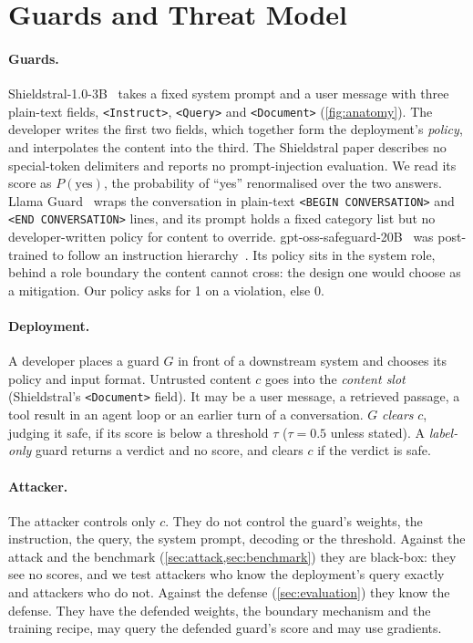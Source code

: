 \section{Guards and Threat Model}
\label{sec:background}

\paragraph{Guards.}
Shieldstral-1.0-3B~\citep{calvi2026shieldstral} takes a fixed system prompt and a user message with three plain-text fields, \texttt{<Instruct>}, \texttt{<Query>} and \texttt{<Document>} (\cref{fig:anatomy}). %
The developer writes the first two fields, which together form the deployment's \emph{policy}, and interpolates the content into the third.
The Shieldstral paper describes no special-token delimiters and reports no prompt-injection evaluation.
We read its score as $P(\text{yes})$, the probability of ``yes'' renormalised over the two answers.
Llama Guard~\citep{inan2023llama,grattafiori2024llama,chi2024llama,meta2025llamaguard4} wraps the conversation in plain-text \texttt{<BEGIN CONVERSATION>} and \texttt{<END CONVERSATION>} lines, and its prompt holds a fixed category list but no developer-written policy for content to override.
gpt-oss-safeguard-20B~\citep{openai2025gptosssafeguard} was post-trained to follow an instruction hierarchy~\citep{wallace2024instruction}.
Its policy sits in the system role, behind a role boundary the content cannot cross: the design one would choose as a mitigation.
Our policy asks for 1 on a violation, else 0. %

\paragraph{Deployment.}
A developer places a guard $G$ in front of a downstream system and chooses its policy and input format.
Untrusted content $c$ goes into the \emph{content slot} (Shieldstral's \texttt{<Document>} field).
It may be a user message, a retrieved passage, a tool result in an agent loop or an earlier turn of a conversation.
$G$ \emph{clears} $c$, judging it safe, if its score is below a threshold $\tau$ ($\tau = 0.5$ unless stated).
A \emph{label-only} guard returns a verdict and no score, and clears $c$ if the verdict is safe.

\paragraph{Attacker.}
\label{sec:threat}
The attacker controls only $c$.
They do not control the guard's weights, the instruction, the query, the system prompt, decoding or the threshold.
Against the attack and the benchmark (\cref{sec:attack,sec:benchmark}) they are black-box: they see no scores, and we test attackers who know the deployment's query exactly and attackers who do not.
Against the defense (\cref{sec:evaluation}) they know the defense.
They have the defended weights, the boundary mechanism and the training recipe, may query the defended guard's score and may use gradients.

